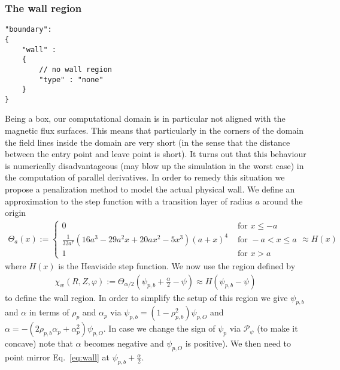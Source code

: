 \subsubsection{The wall region}\label{sec:wall}
\begin{verbatim}
"boundary":
{
    "wall" :
    {
        // no wall region
        "type" : "none"
    }
}
\end{verbatim}
Being a box, our computational domain is in particular not aligned with the
magnetic flux surfaces. This means that particularly in the corners of
the domain the field lines inside the domain are very short (in the
sense that the distance between the entry point and leave point is short).
It turns out that this behaviour is numerically disadvantageous (may
blow up the simulation in the worst case) in the
computation of parallel derivatives.
In order to remedy this situation
we propose a penalization method to model the actual physical wall.
We define an approximation to the step function with a transition layer of radius $a$
around the origin
\begin{align}
\Theta_a(x) := \begin{cases}
    0 & \text{ for } x \leq -a  \\
    \frac{1}{32 a^7}  \left(16 a^3-29 a^2 x+20 a x^2-5 x^3\right) (a+x)^4
    &\text{ for } -a<x\leq a \\
    1 & \text{ for } x > a
\end{cases}
    \approx H(x)
\label{eq:approx_heaviside}
\end{align}
where $H(x)$ is the Heaviside step function.
%
We now use the region defined by
\begin{align}\label{eq:wall}
    \chi_w(R,Z,\varphi):=\Theta_{\alpha/2}\left(\psi_{p,b} + \frac{\alpha}{2} - \psi \right) \approx H(\psi_{p,b}-\psi)
\end{align}
to define the wall region.
In order to simplify the setup of this region we give $\psi_{p,b}$ and $\alpha$ in terms of
$\rho_p$ and $\alpha_p$ via $\psi_{p,b} = (1-\rho_{p,b}^2)\psi_{p,O}$ and $\alpha = -(2\rho_{p,b} \alpha_p + \alpha_p^2)\psi_{p,O}$. In case we change the sign
of $\psi_p$ via $\mathcal P_\psi$ (to make it concave) note that $\alpha$ becomes
negative and $\psi_{p,O}$ is positive).
We then need to point mirror Eq.~\eqref{eq:wall} at $\psi_{p,b}+\frac{\alpha}{2}$.

